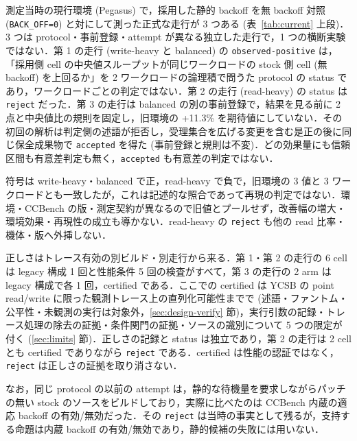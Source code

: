 \documentclass[submit,techrep,noauthor]{ipsj}
\begin{document}
測定当時の現行環境 (Pegasus) で，採用した静的 backoff を無 backoff 対照 (\texttt{BACK\_OFF=0}) と対にして測った正式な走行が 3 つある (表~\ref{tab:current} 上段)．3 つは protocol・事前登録・attempt が異なる独立した走行で，1 つの横断実験ではない．第 1 の走行 (write-heavy と balanced) の \texttt{observed-positive} は，「採用側 cell の中央値スループットが同じワークロードの stock 側 cell (無 backoff) を上回るか」を 2 ワークロードの論理積で問うた protocol の status であり，ワークロードごとの判定ではない．第 2 の走行 (read-heavy) の status は \texttt{reject} だった．第 3 の走行は balanced の別の事前登録で，結果を見る前に 2 点と中央値比の規則を固定し，旧環境の +11.3\% を期待値にしていない．その初回の解析は判定側の述語が拒否し，受理集合を広げる変更を含む是正の後に同じ保全成果物で \texttt{accepted} を得た (事前登録と規則は不変)．どの効果量にも信頼区間も有意差判定も無く，\texttt{accepted} も有意差の判定ではない．

符号は write-heavy・balanced で正，read-heavy で負で，旧環境の 3 値と 3 ワークロードとも一致したが，これは記述的な照合であって再現の判定ではない．環境・CCBench の版・測定契約が異なるので旧値とプールせず，改善幅の増大・環境効果・再現性の成立も導かない．read-heavy の \texttt{reject} も他の read 比率・機体・版へ外挿しない．

正しさはトレース有効の別ビルド・別走行から来る．第 1・第 2 の走行の 6 cell は legacy 構成 1 回と性能条件 5 回の検査がすべて，第 3 の走行の 2 arm は legacy 構成で各 1 回，certified である．ここでの certified は YCSB の point read/write に限った観測トレース上の直列化可能性までで (述語・ファントム・公平性・未観測の実行は対象外，\ref{sec:design-verify} 節)，実行引数の記録・トレース処理の除去の証拠・条件関門の証拠・ソースの識別について 5 つの限定が付く (\ref{sec:limits} 節)．正しさの記録と status は独立であり，第 2 の走行は 2 cell とも certified でありながら \texttt{reject} である．certified は性能の認証ではなく，\texttt{reject} は正しさの証拠を取り消さない．

なお，同じ protocol の以前の attempt は，静的な待機量を要求しながらパッチの無い stock のソースをビルドしており，実際に比べたのは CCBench 内蔵の適応 backoff の有効/無効だった．その \texttt{reject} は当時の事実として残るが，支持する命題は内蔵 backoff の有効/無効であり，静的候補の失敗には用いない．
\end{document}

